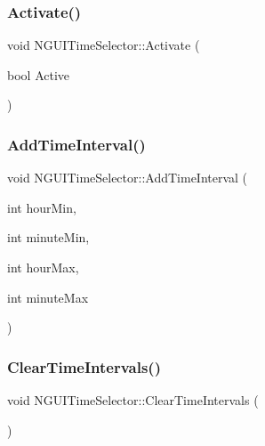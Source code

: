 \subsubsection{\texorpdfstring{Activate()}{Activate()}}
{\footnotesize\ttfamily void N\+G\+U\+I\+Time\+Selector\+::\+Activate (\begin{DoxyParamCaption}\item[{bool}]{Active }\end{DoxyParamCaption})}

\hypertarget{class_n_g_u_i_time_selector_aa260e4e5f1de29b13ea74463ac53e222}{}\label{class_n_g_u_i_time_selector_aa260e4e5f1de29b13ea74463ac53e222} 
\subsubsection{\texorpdfstring{Add\+Time\+Interval()}{AddTimeInterval()}}
{\footnotesize\ttfamily void N\+G\+U\+I\+Time\+Selector\+::\+Add\+Time\+Interval (\begin{DoxyParamCaption}\item[{int}]{hour\+Min,  }\item[{int}]{minute\+Min,  }\item[{int}]{hour\+Max,  }\item[{int}]{minute\+Max }\end{DoxyParamCaption})}

\hypertarget{class_n_g_u_i_time_selector_a2448b4e04b8ae2471aa864fbaff39e48}{}\label{class_n_g_u_i_time_selector_a2448b4e04b8ae2471aa864fbaff39e48} 
\subsubsection{\texorpdfstring{Clear\+Time\+Intervals()}{ClearTimeIntervals()}}
{\footnotesize\ttfamily void N\+G\+U\+I\+Time\+Selector\+::\+Clear\+Time\+Intervals (\begin{DoxyParamCaption}{ }\end{DoxyParamCaption})}

\hypertarget{class_n_g_u_i_time_selector_a5d10c428462bc2a869cda18b7438aca7}{}\label{class_n_g_u_i_time_selector_a5d10c428462bc2a869cda18b7438aca7} 
